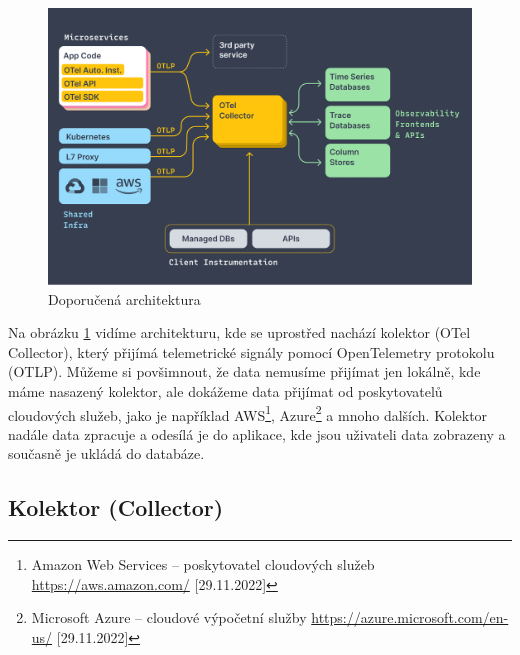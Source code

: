 \begin{figure}[H]
  \centering
  \includegraphics[width=12cm]{obrazky-figures/otel_diagram.png}
  \caption{Doporučená architektura\protect\footnotemark}
  \label{fig:architecture}
\end{figure}

Na obrázku \ref{fig:architecture} vidíme architekturu, kde se uprostřed nachází kolektor (OTel Collector), který přijímá telemetrické signály pomocí OpenTelemetry protokolu (OTLP). Můžeme si povšimnout, že data nemusíme přijímat jen lokálně, kde máme nasazený kolektor, ale dokážeme data přijímat od poskytovatelů cloudových služeb, jako je například AWS\footnote{Amazon Web Services – poskytovatel cloudových služeb \url{https://aws.amazon.com/} [29.11.2022]}, Azure\footnote{Microsoft Azure – cloudové výpočetní služby  \url{https://azure.microsoft.com/en-us/} [29.11.2022]} a mnoho dalších. Kolektor nadále data zpracuje a odesílá je do aplikace, kde jsou uživateli data zobrazeny a současně je ukládá do databáze.
    
\subsection{Kolektor (Collector)}


